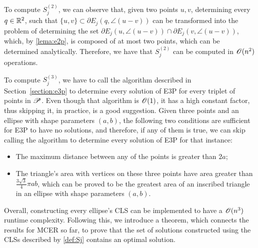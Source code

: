 To compute $S_j^{(2)}$, we can observe that, given two points $u, v$, determining every $q\in\mathbb{R}^2$, such that $\{u,v\}\subset\partial E_j(q, \angle(u-v))$ can be transformed into the problem of determining the set $\partial E_j(u, \angle(u-v)) \cap \partial E_j(v, \angle(u-v))$, which, by \autoref{lema:e2p}, is composed of at most two points, which can be determined analytically. Therefore, we have that $S_j^{(2)}$ can be computed in $\mathscr{O}(n^2)$ operations.

To compute $S_j^{(3)}$, we have to call the algorithm described in Section~\ref{section:e3p} to determine every solution of E3P for every triplet of points in $\mathscr{P}$. Even though that algorithm is $\mathscr{O}(1)$, it has a high constant factor, thus skipping it, in practice, is a good suggestion.
Given three points and an ellipse with shape parameters $(a, b)$, the following two conditions are sufficient for E3P to have no solutions, and therefore, if any of them is true, we can skip calling the algorithm to determine every solution of E3P for that instance:
\begin{itemize}
	\item The maximum distance between any of the points is greater than $2a$;
	\item The triangle's area with vertices on these three points have area greater than $\frac{3\sqrt{3}}{4}\pi ab$, which can be proved to be the greatest area of an inscribed triangle in an ellipse with shape parameters $(a, b)$.
\end{itemize}

Overall, constructing every ellipse's CLS can be implemented to have a $\mathscr{O}(n^3)$ runtime complexity.
Following this, we introduce a theorem, which connects the results for MCER so far, to prove that the set of solutions constructed using the CLSs described by \autoref{def:Sj} contains an optimal solution.


